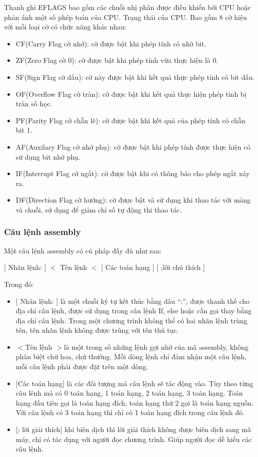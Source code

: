 	Thanh ghi EFLAGS bao gồm các chuỗi nhị phân được điều khiển bởi CPU hoặc phản ánh một số phép toán của CPU. Trạng thái của CPU. Bao gồm 8 cờ hiệu với mỗi loại cờ có chức năng khác nhau:
\begin{itemize}
	\renewcommand{\labelitemi}{\textbullet}		
		\item CF(Carry Flag cờ nhớ): cờ được bật khi phép tính có nhớ bit.
		\item ZF(Zero Flag cờ 0): cờ được bật khi phép tính vừa thực hiện là 0.
\item SF(Sign Flag cờ dấu): cờ này được bật khi kết quả thực phép tính có bit dấu.
\item	OF(Overflow Flag cờ tràn): cờ được bật khi kết quả thực hiện phép tính bị tràn số học.
\item	PF(Parity Flag cờ chẵn lẽ): cờ được bật khi kết quả của phép tính có chẵn bit 1.
\item	AF(Auxilary Flag cờ nhớ phụ): cờ được bật khi phép tính được thực hiện có sử dụng bit nhớ phụ.
\item IF(Interrupt Flag cờ ngắt): cờ được bật khi có thông báo cho phép ngắt xảy ra.
\item DF(Direction Flag cờ hướng): cờ được bật và sử dụng khi thao tác với mảng và chuỗi, sử dụng để giảm chỉ số tự động thi thao tác.
\end{itemize}	
		
		\subsubsection{Câu lệnh assembly}
		Một câu lệnh assembly có cú pháp đầy đủ như sau: 
		 \begin{center}		 
			\selectfont
		 	$[ $ Nhãn lệnh: $]$  	$<$ Tên lệnh $<$ 	$[$ Các toán hạng $]$	$[$ ;lời chú thích $]$ \\
		 \end{center}			
		Trong đó:
		
		\begin{itemize}
		\renewcommand{\labelitemi}{\textbullet}		
		\item $[$ Nhãn lệnh: $]$  là một chuỗi ký tự kết thúc bằng dâu “:”, được thanh thế cho địa chỉ câu lệnh, được sử dụng trong câu lệnh If, else hoặc cần gọi thay bằng địa chỉ câu lệnh. Trong một chương trình không thể có hai nhãn lệnh trùng tên, tên nhãn lệnh không được trùng với tên thủ tục.
		\item $<$Tên lệnh $>$là một trong số những lệnh gợi nhớ của mã assembly, không phân biệt chữ hoa, chữ thường. Mỗi dòng lệnh chỉ đảm nhận một câu lệnh, mỗi câu lệnh phải được đặt trên một dòng.
		\item $[$Các toán hạng$]$ là các đối tượng mà câu lệnh sẽ tác động vào. Tùy theo từng câu lênh mà có 0 toán hạng, 1 toán hạng, 2 toán hạng, 3 toán hạng. Toán hạng đầu tiên gọi là toán hạng đích, toán hạng thứ 2 gọi là toán hạng nguồn. Với câu lệnh có 3 toán hạng thì chỉ có 1 toán hạng đích trong câu lệnh đó. 
		\item $[$; lời giải thích$]$ khi biên dịch thì lời giải thích không được biên dịch sang mã máy, chỉ có tác dụng với người đọc chương trình. Giúp người đọc dễ hiểu các câu lệnh.
		\end{itemize}

